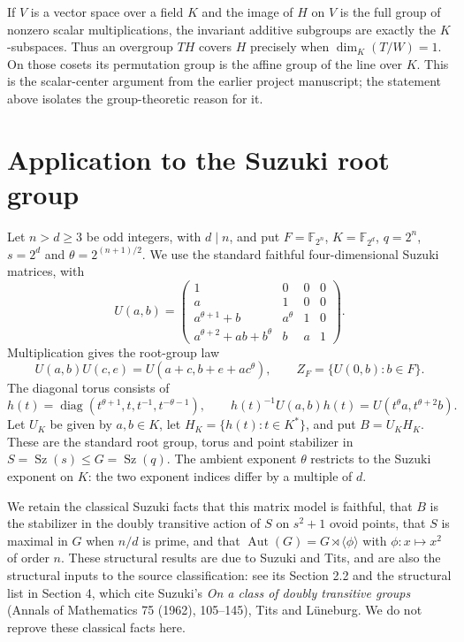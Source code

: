 \documentclass[11pt,a4paper]{article}
\newcommand{\F}{\mathbb F}
\newcommand{\Sz}{\operatorname{Sz}}
\newcommand{\gen}[1]{\langle #1\rangle}
\begin{document}
If $V$ is a vector space over a field $K$ and the image of $H$ on $V$
is the full group of nonzero scalar multiplications, the invariant
additive subgroups are exactly the $K$-subspaces. Thus an overgroup
$TH$ covers $H$ precisely when $\dim_K(T/W)=1$. On those cosets its
permutation group is the affine group of the line over $K$.
This is the scalar-center argument from the earlier project manuscript;
the statement above isolates the group-theoretic reason for it.

\section{Application to the Suzuki root group}
Let $n>d\ge3$ be odd integers, with $d\mid n$, and put
$F=\F_{2^n}$, $K=\F_{2^d}$, $q=2^n$, $s=2^d$ and
$\theta=2^{(n+1)/2}$. We use the standard faithful four-dimensional
Suzuki matrices, with
\[
 U(a,b)=\begin{pmatrix}
 1&0&0&0\\ a&1&0&0\\ a^{\theta+1}+b&a^\theta&1&0\\
 a^{\theta+2}+ab+b^\theta&b&a&1
 \end{pmatrix}.
\]
Multiplication gives the root-group law
\[
 U(a,b)U(c,e)=U(a+c,b+e+ac^\theta),\qquad
 Z_F=\{U(0,b):b\in F\}.
\]
The diagonal torus consists of
\[
 h(t)=\operatorname{diag}(t^{\theta+1},t,t^{-1},t^{-\theta-1}),
 \qquad
 h(t)^{-1}U(a,b)h(t)=U(t^\theta a,t^{\theta+2}b).
                                                        \tag{1}
\]
Let $U_K$ be given by $a,b\in K$, let $H_K=\{h(t):t\in K^*\}$,
and put $B=U_KH_K$. These are the standard root group, torus and
point stabilizer in $S=\Sz(s)\le G=\Sz(q)$. The ambient exponent
$\theta$ restricts to the Suzuki exponent on $K$: the two exponent
indices differ by a multiple of $d$.

We retain the classical Suzuki facts that this matrix model is faithful,
that $B$ is the stabilizer in the doubly transitive action of $S$ on
$s^2+1$ ovoid points, that $S$ is maximal in $G$ when $n/d$ is prime,
and that $\operatorname{Aut}(G)=G\rtimes\gen{\phi}$ with
$\phi:x\mapsto x^2$ of order $n$. These structural results are due to
Suzuki and Tits, and are also the structural inputs to the source
classification: see its Section 2.2 and the structural list in Section 4,
which cite Suzuki's \emph{On a class of doubly transitive groups}
(Annals of Mathematics 75 (1962), 105--145), Tits and L\"uneburg.
We do not reprove these classical facts here.
\end{document}

